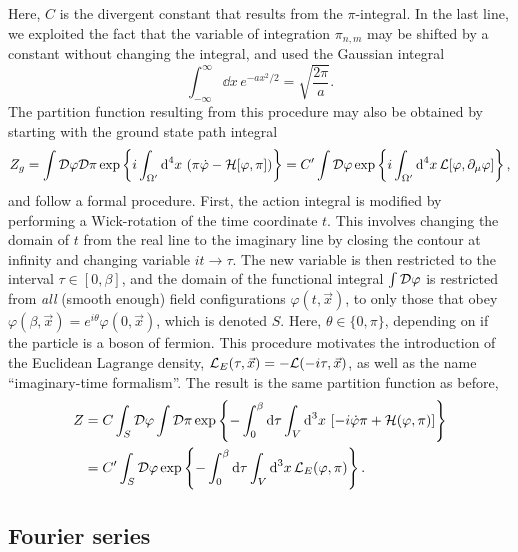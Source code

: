 %
Here, $C$ is the divergent constant that results from the $\pi$-integral.
In the last line, we exploited the fact that the variable of integration $\pi_{n,m}$ may be shifted by a constant without changing the integral, and used the Gaussian integral
%
\begin{equation}
    \int_{-\infty}^{\infty} \dd x \, e^{-a x^2/2} = \sqrt{\frac{2 \pi}{a}}.
\end{equation}
%
The partition function resulting from this procedure may also be obtained by starting with the ground state path integral
%
\begin{equation*}
    Z_g
    =\int \mathcal D\varphi\mathcal D\pi\,
    \text{exp} \left\{ i \int_{\Omega'} \text{d}^4 x \, \left(\pi\dot\varphi - \mathcal{H}[\varphi, \pi]\right) \right\}
    = C' \int \mathcal D \varphi\,
    \text{exp} \left\{ i \int_{\Omega'} \text{d}^4 x \, \mathcal{L}[\varphi, \partial_\mu \varphi] \right\},
\end{equation*}
and follow a formal procedure.
First, the action integral is modified by performing a Wick-rotation of the time coordinate $t$.
This involves changing the domain of $t$ from the real line to the imaginary line by closing the contour at infinity and changing variable $it \rightarrow \tau$.
The new variable is then restricted to the interval $\tau\in [0, \beta]$, and the domain of the functional integral $\int \mathcal D \varphi$ is restricted from \emph{all} (smooth enough) field configurations $\varphi(t, \vec x)$, to only those that obey $\varphi(\beta, \vec x) = e^{i\theta} \varphi(0, \vec x) $, which is denoted $S$.
Here, $\theta \in \{0, \pi\}$, depending on if the particle is a boson of fermion.
This procedure motivates the introduction of  the Euclidean Lagrange density, 
$\mathcal{L}_E(\tau, \vec x) = -\mathcal{L}(-i \tau, \vec x)$, as well as the name ``imaginary-time formalism''.
The result is the same partition function as before,
%
\begin{align}
    Z & = C \int_S \mathcal D \varphi \int \mathcal D \pi\,
    \text{exp} \left\{ 
        - \int_0^\beta \text{d} \tau \int_V \text{d}^3x \, 
        \left[
            - i\dot \varphi \pi
            + \mathcal{H}(\varphi, \pi)
        \right]
     \right\} \nonumber \\ \label{free scalar result 2}
    & =
    C' \int_S \mathcal D \varphi\,
    \text{exp} \left\{ - \int_0^\beta \text{d} \tau \int_V \text{d}^3x \, \mathcal{L}_E(\varphi, \pi) \right\}.
\end{align}
%



\subsection{Fourier series}

